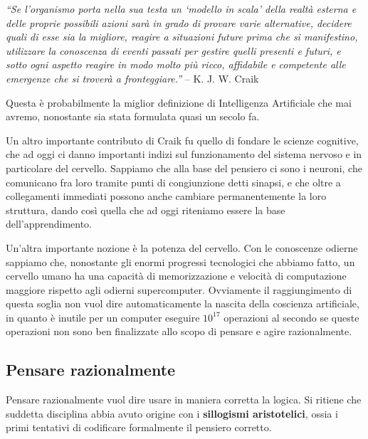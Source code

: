         \begin{center}
            \large\textit{“Se l’organismo porta nella sua testa un ‘modello in scala’
                della realtà esterna e delle proprie possibili azioni sarà in
                grado di provare varie alternative, decidere quali di esse sia
                la migliore, reagire a situazioni future prima che si
                manifestino, utilizzare la conoscenza di eventi passati per
                gestire quelli presenti e futuri, e sotto ogni aspetto reagire in
                modo molto più ricco, affidabile e competente alle
                emergenze che si troverà a fronteggiare.”} -- K. J. W. Craik
            \end{center}
            
            Questa è probabilmente la miglior definizione di Intelligenza Artificiale che mai avremo, nonostante sia stata formulata quasi un secolo fa.
            
            Un altro importante contributo di Craik fu quello di fondare le scienze cognitive, che ad oggi ci danno importanti indizi sul funzionamento del sistema nervoso e in particolare del cervello. Sappiamo che alla base del pensiero ci sono i neuroni, che comunicano fra loro tramite punti di congiunzione detti sinapsi, e che oltre a collegamenti immediati possono anche cambiare permanentemente la loro struttura, dando così quella che ad oggi riteniamo essere la base dell'apprendimento.
            
            Un'altra importante nozione è la potenza del cervello. Con le conoscenze odierne sappiamo che, nonostante gli enormi progressi tecnologici che abbiamo fatto, un cervello umano ha una capacità di memorizzazione e velocità di computazione maggiore rispetto agli odierni supercomputer. Ovviamente il raggiungimento di questa soglia non vuol dire automaticamente la nascita della coscienza artificiale, in quanto è inutile per un computer eseguire $10^{17}$ operazioni al secondo se queste operazioni non sono ben finalizzate allo scopo di pensare e agire razionalmente.
         
        \newpage   
    \subsection{Pensare razionalmente}
        Pensare razionalmente vuol dire usare in maniera corretta la logica. Si ritiene che suddetta disciplina abbia avuto origine con i \textbf{sillogismi aristotelici}, ossia i primi tentativi di codificare formalmente il pensiero corretto.
            
